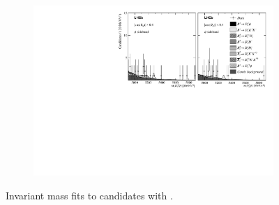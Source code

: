 \begin{figure}[!h]
\begin{subfigure}[t]{1.0\textwidth}
    \end{subfigure}
    \begin{subfigure}[t]{1.0\textwidth}
        \centering
        \includegraphics[width=1.0\textwidth]{figs/Appendix_FitCategories/canvas_DsPhiSide_Ds2KPiPi_both_summed_splitHel_splitKKPi_s21_s21r1_s24_s26.pdf}\\
    \end{subfigure}
    \caption{Invariant mass fits to \decay{\Bp}{\Dsp\phiz} candidates with \decay{\Dsp}{\Kp\pim\pip}.}
\end{figure}


